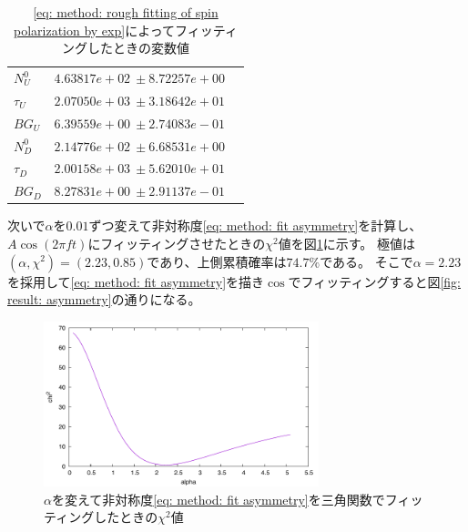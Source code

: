 \documentclass[dvipdfmx]{jsarticle}
\begin{document}
\begin{table}
    \centering
    \caption{\eqref{eq: method: rough fitting of spin polarization by exp}によってフィッティングしたときの変数値}
    \begin{tabular}[]{lrr}
        \toprule
        $N_U^0$ & $4.63817e+02\:\pm8.72257e+00$
        \\
        $\tau_U$ & $2.07050e+03\:\pm3.18642e+01$
        \\
        $BG_U$ & $6.39559e+00\:\pm2.74083e-01$
        \\
        \midrule
        $N_D^0$ & $2.14776e+02\:\pm6.68531e+00$
        \\
        $\tau_D$ & $2.00158e+03\:\pm5.62010e+01$
        \\
        $BG_D$ & $8.27831e+00\:\pm2.91137e-01$
        \\
        \bottomrule
    \end{tabular}
    \label{table: result: parameters of result with B fit with exp}
\end{table}

次いで$\alpha$を$0.01$ずつ変えて非対称度\ref{eq: method: fit asymmetry}を計算し、$A\cos(2\pi ft)$にフィッティングさせたときの$\chi^2$値を図\ref{fig: result: alpha and chi square}に示す。
極値は$(\alpha,\chi^2)=(2.23, 0.85)$であり、上側累積確率は$74.7\%$である。
そこで$\alpha=2.23$を採用して\eqref{eq: method: fit asymmetry}を描き$\cos$でフィッティングすると図\ref{fig: result: asymmetry}の通りになる。

\begin{figure}
    \centering
    \includegraphics[width=8cm]{../analysis/Larmor/ver2/alpha-chi2.pdf}
    \caption{$\alpha$を変えて非対称度\eqref{eq: method: fit asymmetry}を三角関数でフィッティングしたときの$\chi^2$値}
    \label{fig: result: alpha and chi square}
\end{figure}
\end{document}
